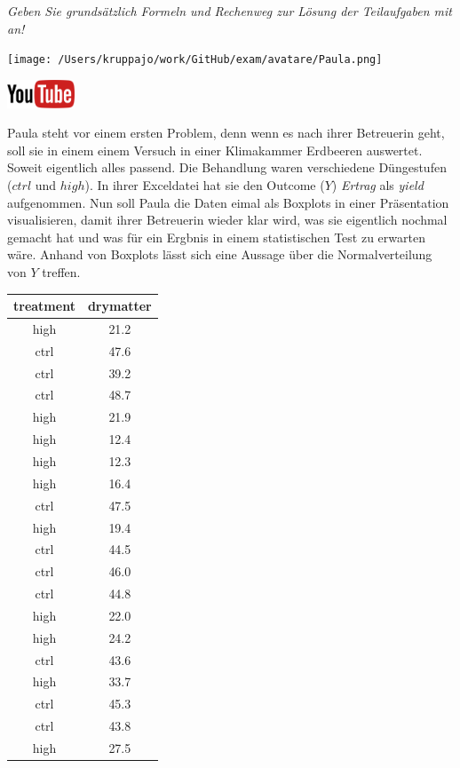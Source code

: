\documentclass[a4paper, 9pt]{scrartcl}\usepackage[]{graphicx}\usepackage[]{xcolor}
\begin{document}
\textit{Geben Sie grundsätzlich Formeln und Rechenweg zur Lösung der Teilaufgaben mit an!} \\[1Ex]
 

 
\begin{minipage}[t]{0.5\textwidth}
\texttt{[image: /Users/kruppajo/work/GitHub/exam/avatare/Paula.png]}
\end{minipage}
\begin{minipage}[t]{0.5\textwidth}
\hfill
\href{https://youtu.be/0xc0jIPeiyw}{\includegraphics[width = 2cm]{img/youtube}}\\[1Ex]
\end{minipage}
\vspace{1ex}



Paula steht vor einem ersten Problem, denn wenn es nach ihrer Betreuerin geht, soll sie in einem einem Versuch in einer Klimakammer Erdbeeren auswertet. Soweit eigentlich alles passend. Die Behandlung waren verschiedene Düngestufen ($ctrl$ und $high$). In ihrer Exceldatei hat sie den Outcome ($Y$) \textit{Ertrag} als \textit{yield} aufgenommen. Nun soll Paula die Daten eimal als Boxplots in einer Präsentation visualisieren, damit ihrer Betreuerin wieder klar wird, was sie eigentlich nochmal gemacht hat und was für ein Ergbnis in einem statistischen Test zu erwarten wäre. Anhand von Boxplots lässt sich eine Aussage über die Normalverteilung von $Y$ treffen.

\begin{table}[!h]
\centering
\begin{tabular}{cc}
\toprule
treatment & drymatter\\
\midrule
high & 21.2\\
ctrl & 47.6\\
ctrl & 39.2\\
ctrl & 48.7\\
high & 21.9\\
\addlinespace
high & 12.4\\
high & 12.3\\
high & 16.4\\
ctrl & 47.5\\
high & 19.4\\
\addlinespace
ctrl & 44.5\\
ctrl & 46.0\\
ctrl & 44.8\\
high & 22.0\\
high & 24.2\\
\addlinespace
ctrl & 43.6\\
high & 33.7\\
ctrl & 45.3\\
ctrl & 43.8\\
high & 27.5\\
\bottomrule
\end{tabular}
\end{table}
\end{document}
